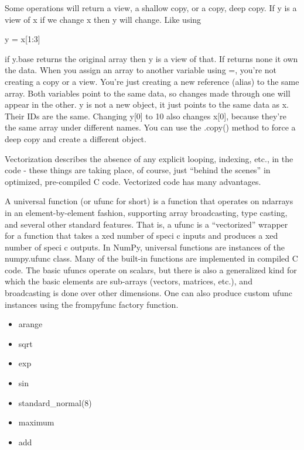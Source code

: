 Some operations will return a view, a shallow copy, or a copy, deep copy.
If y is a view of x if we change x then y will change. Like using 

\begin{pythoncode}
    y = x[1:3]
\end{pythoncode}

if y.base returns the original array then y is a view of that. If returns none it own the data. When you assign an array to another variable using =, you're not creating a copy or a view. You're just creating a new reference (alias) to the same array. Both variables point to the same data, so changes made through one will appear in the other.
y is not a new object, it just points to the same data as x.
Their IDs are the same. Changing y[0] to 10 also changes
x[0], because they're the same array under different names.
You can use the .copy() method to force a deep copy and
create a different object.

\vspace{10pt}

Vectorization describes the absence of any explicit looping,
indexing, etc., in the code - these things are taking place, of
course, just “behind the scenes” in optimized, pre-compiled
C code. Vectorized code has many advantages. 

\vspace{10pt}

A universal function (or ufunc for short) is a function that operates on ndarrays in an element-by-element
fashion, supporting array broadcasting, type casting, and several other standard features. That is, a ufunc
is a “vectorized” wrapper for a function that takes a xed number of speci c inputs and produces a xed
number of speci c outputs.
In NumPy, universal functions are instances of the numpy.ufunc class. Many of the built-in functions are
implemented in compiled C code. The basic ufuncs operate on scalars, but there is also a generalized
kind for which the basic elements are sub-arrays (vectors, matrices, etc.), and broadcasting is done over
other dimensions. One can also produce custom ufunc instances using the frompyfunc factory function.

\begin{itemize}
    \item arange
    \item sqrt
    \item exp
    \item sin
    \item standard\_normal(8)
    \item maximum
    \item add
\end{itemize}


